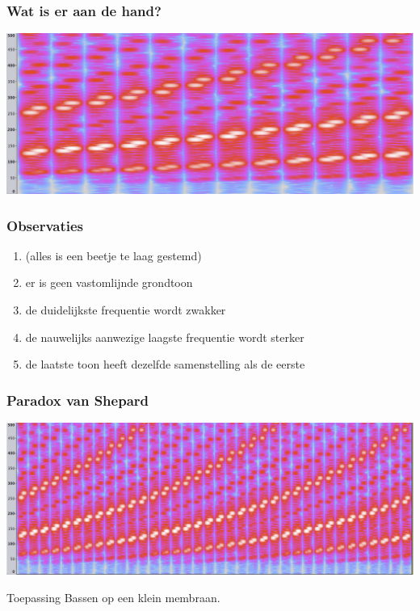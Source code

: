 \documentclass[compress, darktitle, framenumber, handout, totalframenumber]{beamer}
\begin{document}
\begin{frame}
  \frametitle{Wat is er aan de hand?}

  \includegraphics[width=\textwidth]{images/endless-once.png}
\end{frame}

\begin{frame}
  \frametitle{Observaties}

  \begin{enumerate}
    \item (alles is een beetje te laag gestemd)
    \item er is geen vastomlijnde grondtoon
    \item de duidelijkste frequentie wordt \alert{zwakker}
    \item de nauwelijks aanwezige laagste frequentie wordt \alert{sterker}
    \item de laatste toon heeft dezelfde samenstelling als de eerste
  \end{enumerate}
\end{frame}

\begin{frame}
  \frametitle{Paradox van Shepard}

  \includegraphics[width=\textwidth]{images/endless-copies.png}

  \begin{block}{Toepassing}
    Bassen op een klein membraan.
  \end{block}
\end{frame}
\end{document}
